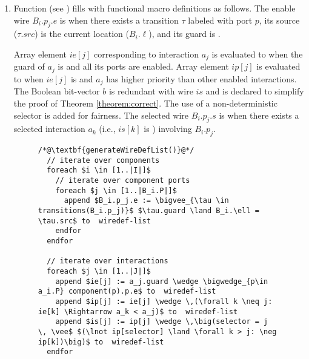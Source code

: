 \begin{enumerate}
\begin{figure}
\begin{lstlisting}
  foreach $i \in [1..|I|]$
    foreach $j \in [1..|B_i.P|]$ 
      // port enablement
      append $wire~bool~B_i.p_j.e$ to  decl-list 
      // port selected
      append $wire~bool~B_i.p_j.s$ to  decl-list 
    endfor

    // location registers
    append $int~B_i.\ell$ to decl-list
    
    foreach $j \in [1..|B_i.X|]$ 
      // variable registers
      append $int~B_i.x_j$ to  decl-list 
    endfor
  endfor
\end{lstlisting}
\caption{ function.}
\label{fig:generate-decl-list}
\end{figure}
%
\item Function  (see ) fills  with functional macro definitions as follows.
The enable wire $B_i.p_j.e$ is \true when there exists a transition $\tau$ labeled with port $p$, its source ($\tau.\mathit{src}$) is the current location ($B_i.\ell$), and its guard is \true. 

Array element $\mathit{ie}[j]$ corresponding to interaction $a_j$ is evaluated to \true when the guard of $a_j$ is \true and all its ports are enabled.
Array element $ip[j]$ is evaluated to \true when $ie[j]$ is \true and $a_j$ has higher priority than other enabled interactions. 
The Boolean bit-vector $b$ is redundant with wire $is$ and is declared to simplify the proof of Theorem \ref{theorem:correct}. 
The use of a non-deterministic selector is added for fairness. 
The selected wire $B_i.p_j.s$ is \true when there exists a selected interaction $a_k$ (i.e., $is[k]$ is \true) involving $B_i.p_j$.
%
\begin{figure}
\begin{lstlisting}
/*@\textbf{generateWireDefList()}@*/
  // iterate over components
  foreach $i \in [1..|I|]$ 
    // iterate over component ports
    foreach $j \in [1..|B_i.P|]$ 
      append $B_i.p_j.e := \bigvee_{\tau \in transitions(B_i.p_j)}$ $\tau.guard \land B_i.\ell = \tau.src$ to  wiredef-list 
    endfor
  endfor
  
  // iterate over interactions
  foreach $j \in [1..|J|]$ 
    append $ie[j] := a_j.guard \wedge \bigwedge_{p\in a_i.P} component(p).p.e$ to  wiredef-list 
    append $ip[j] := ie[j] \wedge \,(\forall k \neq j: ie[k] \Rightarrow a_k < a_j)$ to  wiredef-list 
    append $is[j] := ip[j] \wedge \,\big(selector = j \, \vee$ $(\lnot ip[selector] \land \forall k > j: \neg ip[k])\big)$ to  wiredef-list 
  endfor
  

\end{lstlisting}
\end{figure}
\end{enumerate}
